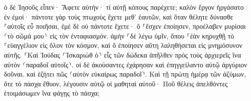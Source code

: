 \documentclass{openreader}
\begin{document}
ὁ δὲ Ἰησοῦς εἶπεν· Ἄφετε αὐτήν· τί αὐτῇ κόπους παρέχετε; καλὸν ἔργον ἠργάσατο ἐν ἐμοί· 
πάντοτε γὰρ τοὺς πτωχοὺς ἔχετε μεθ’ ἑαυτῶν, καὶ ὅταν θέλητε δύνασθε ⸀αὐτοῖς εὖ ποιῆσαι, ἐμὲ δὲ οὐ πάντοτε ἔχετε· 
ὃ ⸀ἔσχεν ἐποίησεν, προέλαβεν μυρίσαι ⸂τὸ σῶμά μου⸃ εἰς τὸν ἐνταφιασμόν. 
ἀμὴν ⸀δὲ λέγω ὑμῖν, ὅπου ⸀ἐὰν κηρυχθῇ τὸ ⸀εὐαγγέλιον εἰς ὅλον τὸν κόσμον, καὶ ὃ ἐποίησεν αὕτη λαληθήσεται εἰς μνημόσυνον αὐτῆς. 
⸀Καὶ Ἰούδας ⸂Ἰσκαριὼθ ὁ⸃ εἷς τῶν δώδεκα ἀπῆλθεν πρὸς τοὺς ἀρχιερεῖς ἵνα αὐτὸν ⸂παραδοῖ αὐτοῖς⸃. 
οἱ δὲ ἀκούσαντες ἐχάρησαν καὶ ἐπηγγείλαντο αὐτῷ ἀργύριον δοῦναι. καὶ ἐζήτει πῶς ⸂αὐτὸν εὐκαίρως παραδοῖ⸃. 
Καὶ τῇ πρώτῃ ἡμέρᾳ τῶν ἀζύμων, ὅτε τὸ πάσχα ἔθυον, λέγουσιν αὐτῷ οἱ μαθηταὶ αὐτοῦ· Ποῦ θέλεις ἀπελθόντες ἑτοιμάσωμεν ἵνα φάγῃς τὸ πάσχα; 
\end{document}
